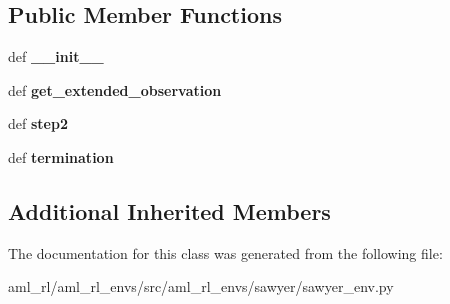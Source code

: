 \subsection*{Public Member Functions}
\begin{DoxyCompactItemize}
\item 
\hypertarget{classaml__rl__envs_1_1sawyer_1_1sawyer__env_1_1_sawyer_env_a47ce03eb7df2cc164695a6fed9b8200c}{def {\bfseries \-\_\-\-\_\-init\-\_\-\-\_\-}}\label{classaml__rl__envs_1_1sawyer_1_1sawyer__env_1_1_sawyer_env_a47ce03eb7df2cc164695a6fed9b8200c}

\item 
\hypertarget{classaml__rl__envs_1_1sawyer_1_1sawyer__env_1_1_sawyer_env_a614ca16ef2788371edc46b770266a9a0}{def {\bfseries get\-\_\-extended\-\_\-observation}}\label{classaml__rl__envs_1_1sawyer_1_1sawyer__env_1_1_sawyer_env_a614ca16ef2788371edc46b770266a9a0}

\item 
\hypertarget{classaml__rl__envs_1_1sawyer_1_1sawyer__env_1_1_sawyer_env_a8c86e35918d246bd0479e6764df16318}{def {\bfseries step2}}\label{classaml__rl__envs_1_1sawyer_1_1sawyer__env_1_1_sawyer_env_a8c86e35918d246bd0479e6764df16318}

\item 
\hypertarget{classaml__rl__envs_1_1sawyer_1_1sawyer__env_1_1_sawyer_env_a5dfef8999de3c23a3b9a0de5a877d5cf}{def {\bfseries termination}}\label{classaml__rl__envs_1_1sawyer_1_1sawyer__env_1_1_sawyer_env_a5dfef8999de3c23a3b9a0de5a877d5cf}

\end{DoxyCompactItemize}
\subsection*{Additional Inherited Members}


The documentation for this class was generated from the following file\-:\begin{DoxyCompactItemize}
\item 
aml\-\_\-rl/aml\-\_\-rl\-\_\-envs/src/aml\-\_\-rl\-\_\-envs/sawyer/sawyer\-\_\-env.\-py\end{DoxyCompactItemize}
